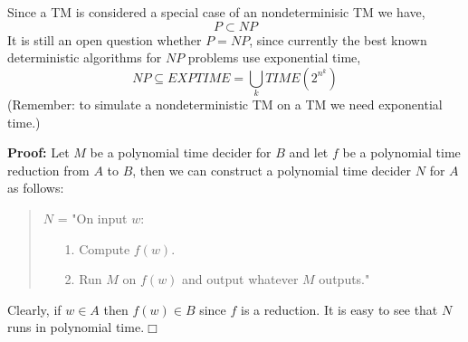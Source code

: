 \documentclass[a4paper,blends,pdf,colorBG,slideColor]{prosper}
\begin{document}
Since a TM is considered a special case of an nondeterminisic TM we have,
\[
P \subset NP
\]
It is still an open question whether $P = NP$, since currently the best known 
deterministic algorithms for $NP$ problems use exponential time,
\[
NP \subseteq EXPTIME = \bigcup_k TIME(2^{n^k})
\]
(Remember: to simulate a nondeterministic TM on a TM we need exponential time.)
\es


\vspace{.2in}


\es


{\bf Proof:} Let $M$ be a polynomial time decider for $B$ and let $f$ be a polynomial time reduction from $A$ to $B$,
then we can construct a polynomial time decider $N$ for $A$ as follows:

\begin{quote}
$N$ = "On input $w$:
\begin{enumerate}
\item[1.] Compute $f(w)$.
\item[2.] Run $M$ on $f(w)$ and output whatever $M$ outputs."
\end{enumerate}
\end{quote}

Clearly, if $w \in A$ then $f(w) \in B$ since $f$ is a reduction.
It is easy to see that $N$ runs in polynomial time.$\Box$
\es

\end{document}
